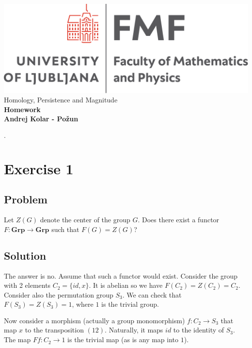 \documentclass{article}
\begin{document}

\begin{titlepage}
    \begin{center}
        \vspace*{1cm}
        \Large
\includegraphics[width=.8\linewidth]{fmflogo.pdf}\\
        \Large
\vspace{3cm}
        Homology, Persistence and Magnitude\\
        \huge
        \textbf{Homework \\}
\Large  
        \vspace{1cm}
        \textbf{Andrej Kolar - Po{\v z}un\\}


\vfill
\normalsize
\end{center}. 
\end{titlepage}

\newpage
{}
\section*{Exercise 1}
\subsection*{Problem}
Let $Z(G)$ denote the center of the group $G$. Does there exist a functor $F: \mathbf{Grp} \to \mathbf{Grp}$ such that $F(G) = Z(G)$?
\subsection*{Solution}
The answer is no. Assume that such a functor would exist. Consider the group with 2 elements $C_2 = \{id, x\}$. It is abelian so we have $F(C_2) = Z(C_2) = C_2$. Consider also the permutation group $S_3$. We can check that $F(S_3) = Z(S_3) = 1$, where $1$ is the trivial group.

Now consider a morphism (actually a group monomorphism) $f: C_2 \to S_3$ that map $x$ to the transposition $(1 2)$.
Naturally, it maps $id$ to the identity of $S_3$. The map $Ff: C_2 \to 1$ is the trivial map (as is any map into $1$).
\end{document}
